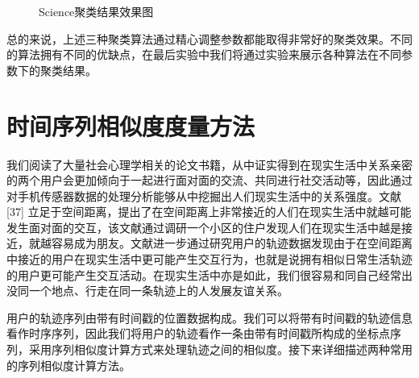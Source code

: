 \begin{figure}[htb]
  \centering%
  \hspace{4em}%
  \hspace{4em}%
  \caption{Science聚类结果效果图}
  \label{fig:sciencecluster}
\end{figure}
\par 总的来说，上述三种聚类算法通过精心调整参数都能取得非常好的聚类效果。不同的算法拥有不同的优缺点，在最后实验中我们将通过实验来展示各种算法在不同参数下的聚类结果。
\section{时间序列相似度度量方法}
\label{sec:section2-2}
我们阅读了大量社会心理学相关的论文书籍，从中证实得到在现实生活中关系亲密的两个用户会更加倾向于一起进行面对面的交流、共同进行社交活动等，因此通过对手机传感器数据的处理分析能够从中挖掘出人们现实生活中的关系强度。文献[37] 立足于空间距离，提出了在空间距离上非常接近的人们在现实生活中就越可能发生面对面的交互，该文献通过调研一个小区的住户发现人们在现实生活中越是接近，就越容易成为朋友。文献\cite{zajonc1968attitudinal}\cite{zillmann2000mood}进一步通过研究用户的轨迹数据发现由于在空间距离中接近的用户在现实生活中更可能产生交互行为，也就是说拥有相似日常生活轨迹的用户更可能产生交互活动。在现实生活中亦是如此，我们很容易和同自己经常出没同一个地点、行走在同一条轨迹上的人发展友谊关系。
\par 用户的轨迹序列由带有时间戳的位置数据构成。我们可以将带有时间戳的轨迹信息看作时序序列，因此我们将用户的轨迹看作一条由带有时间戳所构成的坐标点序列，采用序列相似度计算方式来处理轨迹之间的相似度。接下来详细描述两种常用的序列相似度计算方法。
